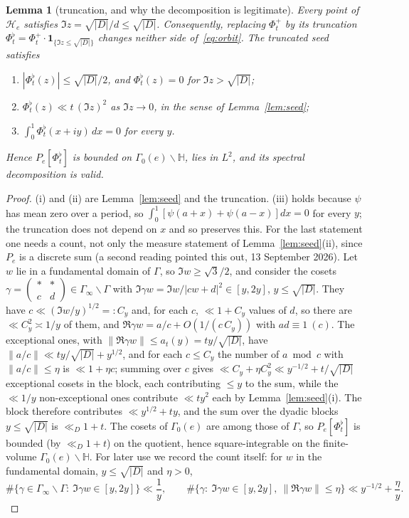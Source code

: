 \documentclass[11pt,a4paper]{article}
\newtheorem{lemma}[theorem]{Lemma}
\theoremstyle{remark}\newtheorem{remark}[theorem]{Remark}
\begin{document}
\begin{lemma}[truncation, and why the decomposition is legitimate]\label{lem:trunc}
Every point of $\mathcal H_e$ satisfies $\Im z=\sqrt{|D|}/d\le\sqrt{|D|}$. Consequently, replacing
$\Phi^+_t$ by its truncation $\Phi^\flat_t=\Phi^+_t\cdot\mathbf 1_{\{\Im z\le\sqrt{|D|}\}}$ changes neither side
of~\eqref{eq:orbit}. The truncated seed satisfies
\begin{enumerate}
\item[(i)] $|\Phi^\flat_t(z)|\le\sqrt{|D|}/2$, and $\Phi^\flat_t(z)=0$ for $\Im z>\sqrt{|D|}$;
\item[(ii)] $\Phi^\flat_t(z)\ll t\,(\Im z)^2$ as $\Im z\to0$, in the sense of Lemma~\ref{lem:seed};
\item[(iii)] $\int_0^1\Phi^\flat_t(x+iy)\,dx=0$ for every $y$.
\end{enumerate}
Hence $P_e[\Phi^\flat_t]$ is bounded on $\Gamma_0(e)\backslash\mathbb H$, lies in $L^2$, and its spectral decomposition is
valid.
\end{lemma}
\begin{proof}
(i) and (ii) are Lemma~\ref{lem:seed} and the truncation. (iii) holds because $\psi$ has mean zero over a period, so $\int_0^1[\psi(a+x)+\psi(a-x)]dx=0$ for every $y$; the
truncation does not depend on $x$ and so preserves this. For the last statement one needs a count, not only the measure statement of Lemma~\ref{lem:seed}(ii), since
$P_e$ is a discrete sum (a second reading pointed this out, 13 September 2026). Let $w$ lie in a fundamental domain
of $\Gamma$, so $\Im w\ge\sqrt3/2$, and consider the cosets $\gamma=\left(\begin{smallmatrix}\ast&\ast\\ c&d\end{smallmatrix}\right)\in\Gamma_\infty\backslash\Gamma$
with $\Im\gamma w=\Im w/|cw+d|^2\in[y,2y]$, $y\le\sqrt{|D|}$. They have $c\ll(\Im w/y)^{1/2}=:C_y$ and, for each $c$,
$\ll1+C_y$ values of $d$, so there are $\ll C_y^2\asymp1/y$ of them, and $\Re\gamma w=a/c+O(1/(c\,C_y))$ with $ad\equiv1\ (c)$.
The exceptional ones, with $\|\Re\gamma w\|\le a_t(y)=ty/\sqrt{|D|}$, have $\|a/c\|\ll ty/\sqrt{|D|}+y^{1/2}$, and for
each $c\le C_y$ the number of $a\bmod c$ with $\|a/c\|\le\eta$ is $\ll1+\eta c$; summing over $c$ gives
$\ll C_y+\eta C_y^2\ll y^{-1/2}+t/\sqrt{|D|}$ exceptional cosets in the block, each contributing $\le y$ to the sum, while
the $\ll1/y$ non-exceptional ones contribute $\ll ty^2$ each by Lemma~\ref{lem:seed}(i). The block therefore
contributes $\ll y^{1/2}+ty$, and the sum over the dyadic blocks $y\le\sqrt{|D|}$ is $\ll_D1+t$. The cosets of
$\Gamma_0(e)$ are among those of $\Gamma$, so $P_e[\Phi^\flat_t]$ is bounded (by $\ll_D1+t$) on the quotient, hence
square-integrable on the finite-volume $\Gamma_0(e)\backslash\mathbb H$. For later use we record the count itself: for $w$
in the fundamental domain, $y\le\sqrt{|D|}$ and $\eta>0$,
\begin{equation}\label{eq:cosetcount}
\#\{\gamma\in\Gamma_\infty\backslash\Gamma:\ \Im\gamma w\in[y,2y]\}\ll\frac1y,\qquad
\#\{\gamma:\ \Im\gamma w\in[y,2y],\ \|\Re\gamma w\|\le\eta\}\ll y^{-1/2}+\frac\eta y .
\end{equation}
\end{proof}
\end{document}
